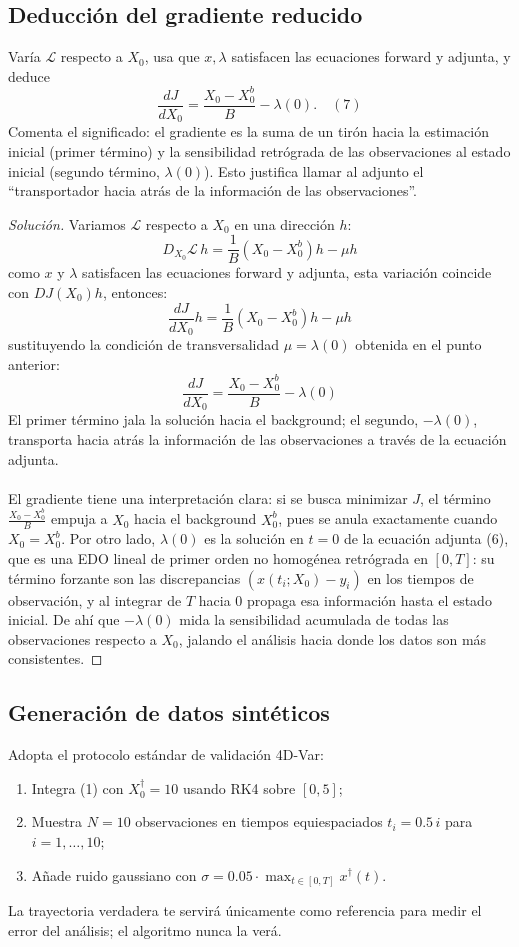 \documentclass[12pt,spanish,mexico]{article}
\numberwithin{equation}{section}
\theoremstyle{definition}
\theoremstyle{remark}
\newenvironment{solution}{\begin{proof}[Solución]}{\end{proof}}
\begin{document}
\subsection{Deducción del gradiente reducido}
Varía \(\mathcal{L}\) respecto a \(X_0\), usa que \(x, \lambda\) satisfacen las ecuaciones forward y adjunta, y deduce
\[
\frac{dJ}{dX_0} = \frac{X_0 - X_0^b}{B} - \lambda(0). \quad (7)
\]
Comenta el significado: el gradiente es la suma de un tirón hacia la estimación inicial (primer término) y la sensibilidad retrógrada de las observaciones al estado inicial (segundo término, \(\lambda(0)\)). Esto justifica llamar al adjunto el “transportador hacia atrás de la información de las observaciones”.

\begin{solution}
Variamos $\mathcal{L}$ respecto a $X_0$ en una dirección $h$:
\[
D_{X_0} \mathcal{L}\, h = \frac{1}{B}(X_0 - X_0^b)h - \mu h
\]
como $x$ y $\lambda$ satisfacen las ecuaciones forward y adjunta, esta variación coincide con $DJ(X_0)h$, entonces:
\[
\frac{dJ}{dX_0} h= \frac{1}{B}(X_0 - X_0^b)h - \mu h
\]
sustituyendo la condición de transversalidad $\mu = \lambda(0)$ obtenida en el punto anterior:
\[
\boxed{\frac{dJ}{dX_0} = \frac{X_0 - X_0^b}{B} - \lambda(0)}
\]
El primer término jala la solución hacia el background; el segundo, $-\lambda(0)$, transporta hacia atrás la información de las observaciones a través de la ecuación adjunta.
\\
\\
El gradiente tiene una interpretación clara: si se busca minimizar $J$, el término 
$\frac{X_0 - X_0^b}{B}$ empuja a $X_0$ hacia el background $X_0^b$, pues se anula 
exactamente cuando $X_0 = X_0^b$. Por otro lado, $\lambda(0)$ es la solución en $t=0$ 
de la ecuación adjunta (6), que es una EDO lineal de primer orden no homogénea retrógrada 
en $[0,T]$: su término forzante son las discrepancias $(x(t_i;X_0)-y_i)$ en los tiempos 
de observación, y al integrar de $T$ hacia $0$ propaga esa información hasta el estado 
inicial. De ahí que $-\lambda(0)$ mida la sensibilidad acumulada de todas las observaciones 
respecto a $X_0$, jalando el análisis hacia donde los datos son más consistentes.

\end{solution}

\subsection{Generación de datos sintéticos}
Adopta el protocolo estándar de validación 4D-Var:
\begin{enumerate}[label=(\alph*)]
\item Integra (1) con \(X_0^\dagger = 10\) usando RK4 sobre \([0, 5]\);

\item Muestra \(N = 10\) observaciones en tiempos equiespaciados \(t_i = 0.5\, i\) para \(i = 1, \dots, 10\);
\item Añade ruido gaussiano con \(\sigma = 0.05 \cdot \max_{t\in[0,T]} x^\dagger(t)\).
\end{enumerate}
La trayectoria verdadera te servirá únicamente como referencia para medir el error del análisis; el algoritmo nunca la verá.
\end{document}
